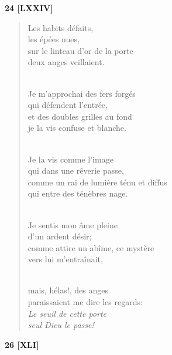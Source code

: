 \documentclass[a4paper,12pt]{book}
\begin{document}
\bigskip

\begin{center} {\bf 24 [LXXIV]} \end{center}

\begin{verse}
Les habits défaits, \\
les épées nues, \\
sur le linteau d'or de la porte \\
deux anges veillaient. \\ \

Je m'approchai des fers forgés \\
qui défendent l'entrée, \\
et des doubles grilles au fond \\
je la vis confuse et blanche. \\ \

Je la vis comme l'image \\
qui dans une rêverie passe, \\
comme un rai de lumière ténu et diffus \\
qui entre des ténèbres nage. \\ \

Je sentis mon âme pleine \\
d'un ardent désir; \\
comme attire un abîme, ce mystère \\
vers lui m'entraînait, \\ \

mais, hélas!, des anges \\
paraissaient me dire les regards: \\
{\em Le seuil de cette porte \\
seul Dieu le passe!} \\
\end{verse}

\bigskip

\begin{center} {\bf 26 [XLI]} \end{center}
\end{document}
